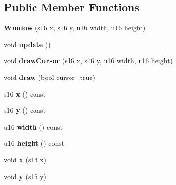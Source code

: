 \subsection*{Public Member Functions}
\begin{DoxyCompactItemize}
\item 
\hypertarget{classWindow_a8a34ab9865729e9075acc3e0a99f121b}{{\bfseries Window} (s16 x, s16 y, u16 width, u16 height)}\label{classWindow_a8a34ab9865729e9075acc3e0a99f121b}

\item 
\hypertarget{classWindow_a59515fc5a56e86d5a46d771595daac55}{void {\bfseries update} ()}\label{classWindow_a59515fc5a56e86d5a46d771595daac55}

\item 
\hypertarget{classWindow_a05e89849f1b82b2f47c7428e4145ad6c}{void {\bfseries draw\-Cursor} (s16 x, s16 y, u16 width, u16 height)}\label{classWindow_a05e89849f1b82b2f47c7428e4145ad6c}

\item 
\hypertarget{classWindow_a6a1e38ec09e8a262e485c49475840bcb}{void {\bfseries draw} (bool cursor=true)}\label{classWindow_a6a1e38ec09e8a262e485c49475840bcb}

\item 
\hypertarget{classWindow_ae9a1f20119b4633e29931593e8c76a4e}{s16 {\bfseries x} () const }\label{classWindow_ae9a1f20119b4633e29931593e8c76a4e}

\item 
\hypertarget{classWindow_a2018bb6253b2e1357b90e6aaadcece21}{s16 {\bfseries y} () const }\label{classWindow_a2018bb6253b2e1357b90e6aaadcece21}

\item 
\hypertarget{classWindow_a1a14b80d65c1a9824bf623880f2fbaad}{u16 {\bfseries width} () const }\label{classWindow_a1a14b80d65c1a9824bf623880f2fbaad}

\item 
\hypertarget{classWindow_aaf54b86cda72283958fba3f904ed5f6d}{u16 {\bfseries height} () const }\label{classWindow_aaf54b86cda72283958fba3f904ed5f6d}

\item 
\hypertarget{classWindow_a2c720225fd60f19cfe046e764978c8f8}{void {\bfseries x} (s16 x)}\label{classWindow_a2c720225fd60f19cfe046e764978c8f8}

\item 
\hypertarget{classWindow_a7166a3e1101ebc1d6e2d9817eec2857b}{void {\bfseries y} (s16 y)}\label{classWindow_a7166a3e1101ebc1d6e2d9817eec2857b}


\end{DoxyCompactItemize}
